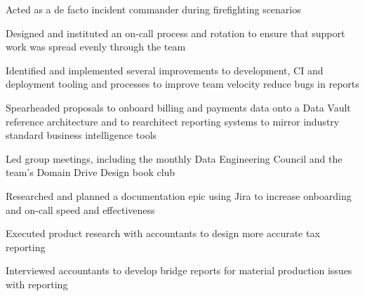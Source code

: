 \begin{job}

  \begin{accomplishments}
    \item Acted as a de facto incident commander during firefighting scenarios
    \item Designed and instituted an on-call process and rotation to ensure that
    support work was spread evenly through the team
    \item Identified and implemented several improvements to development, CI and
    deployment tooling and processes to improve team velocity reduce bugs in
    reports
    \item Spearheaded proposals to onboard billing and payments data onto a
    Data Vault reference architecture and to rearchitect reporting systems
    to mirror industry standard business intelligence tools
    \item Led group meetings, including the monthly Data Engineering Council and
    the team's Domain Drive Design book club
    \item Researched and planned a documentation epic using Jira to increase
    onboarding and on-call speed and effectiveness
    \item Executed product research with accountants to design more accurate tax
    reporting
    \item Interviewed accountants to develop bridge reports for material
    production issues with reporting
  \end{accomplishments}
\end{job}
